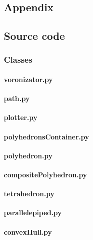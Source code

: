 \begin{appendices}
\part{Appendix}
\chapter{Source code}
\section{Classes}
\subsection{voronizator.py}

\subsection{path.py}

\subsection{plotter.py}

\subsection{polyhedronsContainer.py}

\subsection{polyhedron.py}

\subsection{compositePolyhedron.py}

\subsection{tetrahedron.py}

\subsection{parallelepiped.py}

\subsection{convexHull.py}


\end{appendices}
